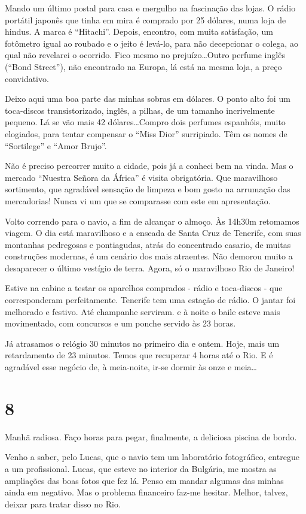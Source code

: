 Mando um último postal para casa e mergulho na fascinação das lojas. O rádio portátil japonês que tinha em mira é comprado por 25 dólares, numa loja de hindus. A marca é “Hitachi”. Depois, encontro, com muita satisfação, um fotômetro igual ao roubado e o jeito é levá-lo, para não decepcionar o colega, ao qual não revelarei o ocorrido. Fico mesmo no prejuízo\ldots Outro perfume inglês (“Bond Street”), não encontrado na Europa, lá está na mesma loja, a preço convidativo.

Deixo aqui uma boa parte das minhas sobras em dólares. O ponto alto foi um toca-discos transistorizado, inglês, a pilhas, de um tamanho incrivelmente pequeno. Lá se vão mais 42 dólares\ldots Compro dois perfumes espanhóis, muito elogiados, para tentar compensar o “Miss Dior” surripiado. Têm os nomes de “Sortilege” e “Amor Brujo”.

Não é preciso percorrer muito a cidade, pois já a conheci bem na vinda. Mas o mercado “Nuestra Señora da África” é visita obrigatória. Que maravilhoso sortimento, que agradável sensação de limpeza e bom gosto na arrumação das mercadorias! Nunca vi um que se comparasse com este em apresentação.

Volto correndo para o navio, a fim de alcançar o almoço. Às 14h30m retomamos viagem. O dia está maravilhoso e a enseada de Santa Cruz de Tenerife, com suas montanhas pedregosas e pontiagudas, atrás do concentrado casario, de muitas construções modernas, é um cenário dos mais atraentes. Não demorou muito a desaparecer o último vestígio de terra. Agora, só o maravilhoso Rio de Janeiro!

Estive na cabine a testar os aparelhos comprados - rádio e toca-discos - que corresponderam perfeitamente. Tenerife tem uma estação de rádio. O jantar foi melhorado e festivo. Até champanhe serviram. e à noite o baile esteve mais movimentado, com concursos e um ponche servido às 23 horas.

Já atrasamos o relógio 30 minutos no primeiro dia e ontem. Hoje, mais um retardamento de 23 minutos. Temos que recuperar 4 horas até o Rio. E é agradável esse negócio de, à meia-noite, ir-se dormir às onze e meia\ldots

\section*{8 \adfflatleafright {}}
Manhã radiosa. Faço horas para pegar, finalmente, a deliciosa piscina de bordo.

Venho a saber, pelo Lucas, que o navio tem um laboratório fotográfico, entregue a um profissional. Lucas, que esteve no interior da Bulgária, me mostra as ampliações das boas fotos que fez lá. Penso em mandar algumas das minhas ainda em negativo. Mas o problema financeiro faz-me hesitar. Melhor, talvez, deixar para tratar disso no Rio.

